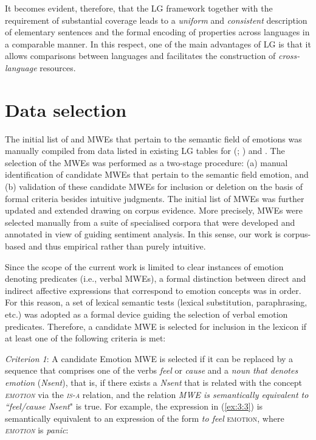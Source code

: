 \documentclass[output=paper]{langsci/langscibook}
\begin{document}
It becomes evident, therefore, that the LG framework together with the
requirement of substantial coverage leads to a
\textit{uniform} and \textit{consistent}
description of elementary sentences and the formal encoding of
properties across languages in a comparable manner. In this respect,
one of the main advantages of LG is that it allows comparisons between
languages and facilitates the construction of
\textit{cross-language} resources.

\section{Data selection}


The initial list of  and  MWEs that pertain to the semantic field of
emotions was manually compiled from data listed in existing LG tables
for  (\citealt{fotopoulou1993}; \citealt{Mini2009}) and  \citep{gross1982}. The selection of the  MWEs was performed as a two-stage
procedure: (a) manual identification of candidate MWEs that pertain to
the semantic field emotion, and (b) validation of these candidate MWEs
for inclusion or deletion on the basis of formal criteria besides
intuitive judgments. The initial list of MWEs was further updated and
extended drawing on corpus evidence. More precisely,  MWEs were
selected manually from a suite of specialised corpora \citep{giouli2014} that were developed and annotated in view of guiding
sentiment analysis. In this sense, our work is corpus-based and thus
empirical rather than purely intuitive.



Since the scope of the current work is limited to clear instances of
emotion denoting predicates (i.e., verbal MWEs), a formal distinction
between direct and indirect affective expressions that correspond to
emotion concepts was in order. For this reason, a set of lexical
semantic tests (lexical substitution, paraphrasing, etc.) was adopted as
a formal device guiding the selection of  verbal emotion predicates.
Therefore, a candidate MWE is selected for inclusion in the
lexicon if at least one of the following criteria is met:


\textit{Criterion 1}: A candidate Emotion MWE is selected if it can be replaced by a sequence
that comprises one of the verbs \textit{feel} or
\textit{cause} and a \textit{noun that denotes
emotion} (\textit{Nsent}), that is, if there exists a \textit{Nsent}
that is related with the concept \textit{\textsc{emotion}}
via the \textit{\textsc{is-a}} relation, and the relation
\textit{MWE is semantically equivalent to ``feel/cause Nsent}" is true. For example, the
expression in (\ref{ex:3:3}) is semantically equivalent to an expression of the
form \textit{to feel} \textsc{emotion}, where
\textit{\textsc{emotion}} is \textit{panic}:
\end{document}
